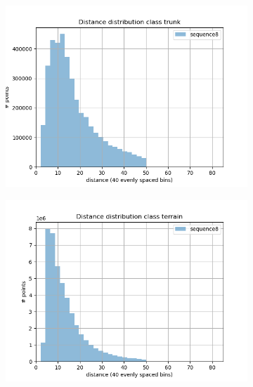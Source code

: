 \begin{figure}[h]
\begin{subfigure}[b]{0.24\textwidth}
         \includegraphics[width=\textwidth]{Figures/Chapter4/dist-height/dist/test/class16.png}
     \end{subfigure}
     \hfill
     \begin{subfigure}[b]{0.24\textwidth}
         \centering
         \includegraphics[width=\textwidth]{Figures/Chapter4/dist-height/dist/test/class17.png}
     \end{subfigure}
     \begin{subfigure}[b]{0.24\textwidth}
         \centering

\end{subfigure}
\end{figure}
